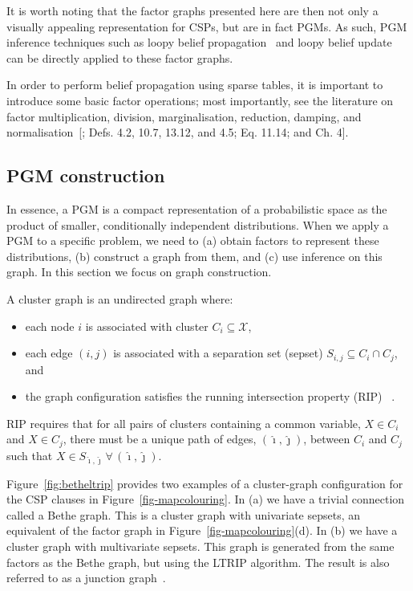 \documentclass{ieeeaccess}
\begin{document}
It is worth noting that the factor graphs presented here are then not only a visually appealing representation for CSPs, but are in fact PGMs. As such, PGM inference techniques such as loopy belief propagation~\cite{MoonT} and loopy belief update~\cite{koller, lauritzen1988local} can be directly applied to these factor graphs. 

In order to perform belief propagation using sparse tables, it is important to introduce some basic factor operations; most importantly, see the literature on factor multiplication, division, marginalisation, reduction, damping, and normalisation~[; Defs. 4.2, 10.7, 13.12, and 4.5; Eq. 11.14; and Ch. 4].


\subsection{PGM construction}\label{sec:ltrip}
In essence, a PGM is a compact representation of a probabilistic space as the product of smaller, conditionally independent distributions. When we apply a PGM to a specific problem, we need to (a) obtain factors to represent these distributions, (b) construct a graph from them, and (c) use inference on this graph. In this section we focus on graph construction.

A cluster graph is an undirected graph where:
\begin{itemize}
	\item each node $i$ is associated with cluster $C_i \subseteq \mathcal{X}$, 
	\item each edge $(i, j)$ is associated with a separation set (sepset) $S_{i,j} \subseteq C_i \cap C_j$, and 
	\item the graph configuration satisfies the running intersection property (RIP)~\cite{koller}%
	.
\end{itemize}
RIP requires that for all pairs of clusters containing a common variable, $X \in C_i$ and $X \in C_j$, there must be a unique path of edges, $(\hat{\imath}, \hat{\jmath})$, between $C_i$ and $C_j$ such that $X \in S_{\hat{\imath}, \hat{\jmath}}\, \forall\, (\hat{\imath}, \hat{\jmath})$.

Figure~\ref{fig:betheltrip} provides two examples of a cluster-graph configuration for the CSP clauses in Figure~\ref{fig-mapcolouring}. In (a) we have a trivial connection called a Bethe graph. This is a cluster graph with univariate sepsets, an equivalent of the factor graph in Figure~\ref{fig-mapcolouring}(d). In (b) we have a cluster graph with multivariate sepsets. This graph is generated from the same factors as the Bethe graph, but using the LTRIP algorithm\cite{streicher}. The result is also referred to as a junction graph~\cite{dechter2010on}.
\end{document}
